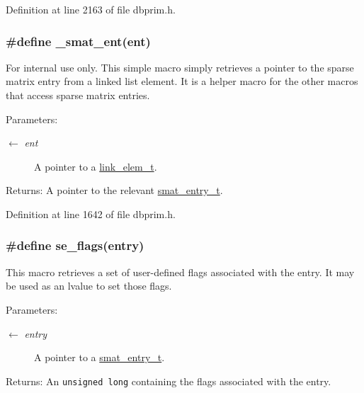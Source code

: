 Definition at line 2163 of file dbprim.h.\hypertarget{group__dbprim__smat_ga32}{
\subsubsection[\_\-smat\_\-ent]{\setlength{\rightskip}{0pt plus 5cm}\#define \_\-smat\_\-ent(ent)}}
\label{group__dbprim__smat_ga32}


\begin{Desc}
\item[For internal use only.]
This simple macro simply retrieves a pointer to the sparse matrix entry from a linked list element. It is a helper macro for the other macros that access sparse matrix entries.

\begin{Desc}
\item[Parameters:]
\begin{description}
\item[\mbox{$\leftarrow$} {\em ent}]A pointer to a \hyperlink{group__dbprim__link_ga1}{link\_\-elem\_\-t}.\end{description}
\end{Desc}
\begin{Desc}
\item[Returns:]A pointer to the relevant \hyperlink{group__dbprim__smat_ga2}{smat\_\-entry\_\-t}.\end{Desc}
\end{Desc}


Definition at line 1642 of file dbprim.h.\hypertarget{group__dbprim__smat_ga58}{
\subsubsection[se\_\-flags]{\setlength{\rightskip}{0pt plus 5cm}\#define se\_\-flags(entry)}}
\label{group__dbprim__smat_ga58}


This macro retrieves a set of user-defined flags associated with the entry. It may be used as an lvalue to set those flags.

\begin{Desc}
\item[Parameters:]
\begin{description}
\item[\mbox{$\leftarrow$} {\em entry}]A pointer to a \hyperlink{group__dbprim__smat_ga2}{smat\_\-entry\_\-t}.\end{description}
\end{Desc}
\begin{Desc}
\item[Returns:]An {\tt unsigned long} containing the flags associated with the entry.\end{Desc}


